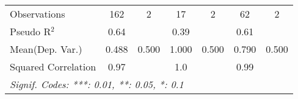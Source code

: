 \begin{tabular}{lcccccc}
   Observations                                               & 162             & 2    & 17      & 2    & 62      & 2\\  
   Pseudo R$^2$                                               & 0.64            &      & 0.39    &      & 0.61    & \\  
Mean(Dep. Var.) & 0.488 & 0.500 & 1.000 & 0.500 & 0.790 & 0.500 \\
   Squared Correlation                                        & 0.97            &      & 1.0     &      & 0.99    & \\  
   \midrule \midrule
   \multicolumn{7}{l}{\emph{Signif. Codes: ***: 0.01, **: 0.05, *: 0.1}}\\
\end{tabular}
\par\endgroup
